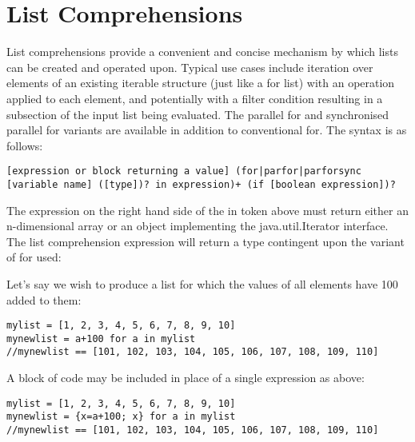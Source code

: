 \documentclass[conc-doc]{subfiles}
\begin{document}
	
	\chapter[List Comprehensions]{List Comprehensions}
	\label{ch:listComp}
List comprehensions provide a convenient and concise mechanism by which lists can be created and operated upon. Typical use cases include iteration over elements of an existing iterable structure (just like a for list) with an operation applied to each element, and potentially with a filter condition resulting in a subsection of the input list being evaluated. The parallel for and synchronised parallel for variants are available in addition to conventional for. The syntax is as follows:

\begin{center}
	\lstinline{[expression or block returning a value] (for|parfor|parforsync [variable name] ([type])? in expression)+ (if [boolean expression])?}
\end{center}


The expression on the right hand side of the in token above must return either an n-dimensional array or an object implementing the java.util.Iterator interface. The list comprehension expression will return a type contingent upon the variant of for used:

\begin{table}[H]
	\centering
\end{table}


Let’s say we wish to produce a list for which the values of all elements have 100 added to them:
\begin{lstlisting}
mylist = [1, 2, 3, 4, 5, 6, 7, 8, 9, 10]
mynewlist = a+100 for a in mylist
//mynewlist == [101, 102, 103, 104, 105, 106, 107, 108, 109, 110]
\end{lstlisting}

A block of code may be included in place of a single expression as above:
\begin{lstlisting}
mylist = [1, 2, 3, 4, 5, 6, 7, 8, 9, 10]
mynewlist = {x=a+100; x} for a in mylist
//mynewlist == [101, 102, 103, 104, 105, 106, 107, 108, 109, 110]
\end{lstlisting}
\end{document}
